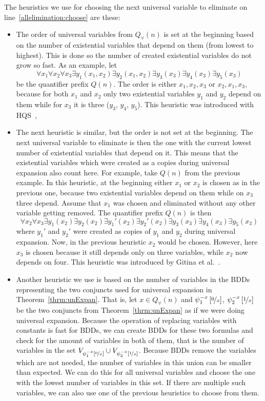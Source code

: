 \documentclass[
  digital, %
  color,
  twoside, %
  table,   %
  nolof,     %
  nolot,     %
]{fithesis3}
\theoremstyle{definition}
\theoremstyle{remark}
\newcommand{\substitute}[2]{\left[ \nicefrac{#2}{#1} \right]}
\newcommand{\vars}[1]{V_{#1}}
\newcommand{\prefix}[1]{Q({#1})}
\newcommand{\uprefix}[1]{Q_{\forall}(#1)}
\begin{document}
The heuristics we use for choosing the next universal variable to eliminate on line~\ref{allelimination:choose} are these:
\begin{itemize}
    \item The order of universal variables from $\uprefix{n}$ is set at the beginning based on the number of existential variables that depend on them (from lowest to highest). This is done so the number of created existential variables do not grow so fast. %
    As an example, let
    \[\forall x_1 \forall x_2 \forall x_3 \exists y_1(x_1, x_2) \exists y_2(x_1,x_2) \exists y_3(x_3) \exists y_4(x_3) \exists y_5 (x_3)\]
    be the quantifier prefix $\prefix{n}$. The order is either $x_1, x_2, x_3$ or $x_2, x_1, x_3$, because for both $x_1$ and $x_2$ only two existential variables $y_1$ and $y_2$ depend on them while for $x_3$ it is three ($y_3$, $y_4$, $y_5$). This heuristic was introduced with HQS~\cite{HQSquantifierElimination}, 
    \item The next heuristic is similar, but the order is not set at the beginning. The next universal variable to eliminate is then the one with the current lowest number of existential variables that depend on it. This means that the existential variables which were created as a copies during universal expansion also count here. For example, take $\prefix{n}$ from the previous example. In this heuristic, at the beginning either $x_1$ or $x_2$ is chosen as in the previous one, because two existential variables depend on them while on $x_3$ three depend. Assume that $x_1$ was chosen and eliminated without any other variable getting removed. The quantifier prefix $\prefix{n}$ is then
    \[\forall x_2 \forall x_3 \exists y_1(x_2) \exists y_2(x_2) \exists y_1'(x_2) \exists y_2'(x_2) \exists y_3(x_3) \exists y_4(x_3) \exists y_5 (x_3)\]
    where $y_1'$ and $y_2'$ were created as copies of $y_1$ and $y_2$ during universal expansion. Now, in the previous heuristic $x_2$ would be chosen. However, here $x_3$ is chosen because it still depends only on three variables, while $x_2$ now depends on four. This heuristic was introduced by Gitina et al.~\cite{HQSsimpleAlg}.
    \item Another heuristic we use is based on the number of variables in the BDDs representing the two conjuncts used for universal expansion in Theorem~\ref{thrm:unExpan}. That is, let $x \in \uprefix{n}$ and $\psi_1^{-x}\substitute{x}{0}$, $\psi_2^{-x}\substitute{x}{1}$
    be the two conjuncts from Theorem~\ref{thrm:unExpan} as if we were doing universal expansion. Because the operation of replacing variables with constants is fast for BDDs, we can create BDDs for these two formulas and check for the amount of variables in both of them, that is the number of variables in the set $\vars{\psi_1^{-x}\substitute{x}{0}} \cup \vars{\psi_2^{-x}\substitute{x}{1}}$. Because BDDs remove the variables which are not needed, the number of variables in this union can be smaller than expected. We can do this for all universal variables and choose the one with the lowest number of variables in this set. If there are multiple such variables, we can also use one of the previous heuristics to choose from them.

\end{itemize}
\end{document}
